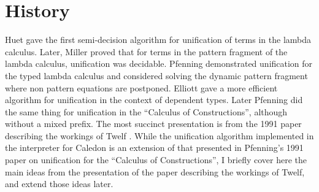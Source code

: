 \section{History}

Huet \citep{Huet75} gave the first semi-decision algorithm for unification of 
terms in the lambda calculus.  
Later, Miller \citep{miller1986higher} proved
that for terms in the pattern fragment of the lambda calculus, unification was decidable.  
Pfenning \citep{pfenning1988partial} \citep{pfenning1988higher} demonstrated unification 
for the typed lambda calculus and considered solving the dynamic pattern fragment where non pattern equations
are postponed.
Elliott\citep{elliott1989higher} gave a more efficient algorithm for unification in the context 
of dependent types. Later Pfenning \citep{pfenning1991unification}
did the same thing for unification in the ``Calculus of Constructions'', although without a mixed prefix.  
The most succinct presentation is from the 1991 paper describing the workings of Twelf 
\citep{pfenning1991logic}.  While the unification algorithm implemented in the interpreter for Caledon is 
an extension of that presented in Pfenning's 1991 paper on unification for 
the ``Calculus of Constructions''\citep{pfenning1991unification}, 
I briefly cover here the main ideas from the presentation of the paper describing the workings of Twelf, 
and extend those ideas later.


